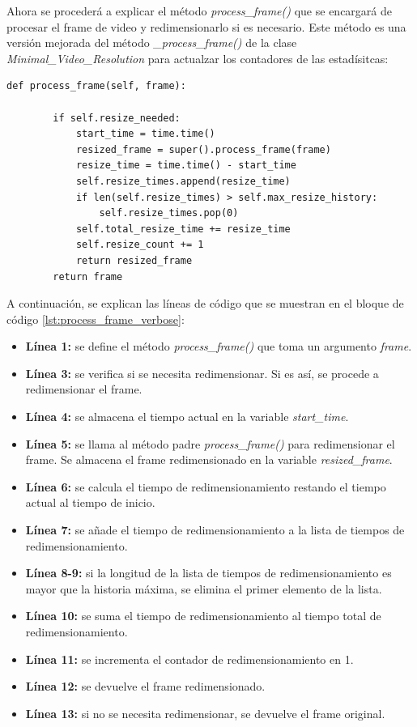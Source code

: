 Ahora se procederá a explicar el método \textit{process\_frame()} que se encargará de procesar el frame de video y redimensionarlo si es necesario. Este método es una versión mejorada del método \textit{\_process\_frame()} de la clase \textit{Minimal\_Video\_Resolution} para actualzar los contadores de las estadísitcas:
\begin{lstlisting}[style=pythonstyle, caption={Método process\_frame() de \textit{Minimal\_Video\_Resolution\_verbose}}, label={lst:process_frame_verbose}]
def process_frame(self, frame):
        
        if self.resize_needed:
            start_time = time.time()
            resized_frame = super().process_frame(frame)
            resize_time = time.time() - start_time
            self.resize_times.append(resize_time)
            if len(self.resize_times) > self.max_resize_history:
                self.resize_times.pop(0)
            self.total_resize_time += resize_time
            self.resize_count += 1
            return resized_frame
        return frame
\end{lstlisting}
\vspace{\baselineskip}

A continuación, se explican las líneas de código que se muestran en el bloque de código \ref{lst:process_frame_verbose}:
\begin{itemize}
    \item \textbf{Línea 1:} se define el método \textit{process\_frame()} que toma un argumento \textit{frame}.
    \item \textbf{Línea 3:} se verifica si se necesita redimensionar. Si es así, se procede a redimensionar el frame.
    \item \textbf{Línea 4:} se almacena el tiempo actual en la variable \textit{start\_time}.
    \item \textbf{Línea 5:} se llama al método padre \textit{process\_frame()} para redimensionar el frame. Se almacena el frame redimensionado en la variable \textit{resized\_frame}.
    \item \textbf{Línea 6:} se calcula el tiempo de redimensionamiento restando el tiempo actual al tiempo de inicio.
    \item \textbf{Línea 7:} se añade el tiempo de redimensionamiento a la lista de tiempos de redimensionamiento.
    \item \textbf{Línea 8-9:} si la longitud de la lista de tiempos de redimensionamiento es mayor que la historia máxima, se elimina el primer elemento de la lista.
    \item \textbf{Línea 10:} se suma el tiempo de redimensionamiento al tiempo total de redimensionamiento.
    \item \textbf{Línea 11:} se incrementa el contador de redimensionamiento en 1.
    \item \textbf{Línea 12:} se devuelve el frame redimensionado.
    \item \textbf{Línea 13:} si no se necesita redimensionar, se devuelve el frame original.
\end{itemize}
\vspace{\baselineskip}

